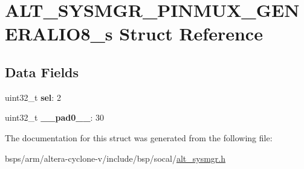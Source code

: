 \hypertarget{structALT__SYSMGR__PINMUX__GENERALIO8__s}{}\section{A\+L\+T\+\_\+\+S\+Y\+S\+M\+G\+R\+\_\+\+P\+I\+N\+M\+U\+X\+\_\+\+G\+E\+N\+E\+R\+A\+L\+I\+O8\+\_\+s Struct Reference}
\label{structALT__SYSMGR__PINMUX__GENERALIO8__s}
\subsection*{Data Fields}
\begin{DoxyCompactItemize}
\item 
\mbox{\label{structALT__SYSMGR__PINMUX__GENERALIO8__s_a3406c3f376d67e983743a19614cf184b}} 
uint32\+\_\+t {\bfseries sel}\+: 2
\item 
\mbox{\label{structALT__SYSMGR__PINMUX__GENERALIO8__s_a0c49b4a942a46657faf72721c74de5a2}} 
uint32\+\_\+t {\bfseries \+\_\+\+\_\+pad0\+\_\+\+\_\+}\+: 30
\end{DoxyCompactItemize}


The documentation for this struct was generated from the following file\+:\begin{DoxyCompactItemize}
\item 
bsps/arm/altera-\/cyclone-\/v/include/bsp/socal/\mbox{\hyperlink{alt__sysmgr_8h}{alt\+\_\+sysmgr.\+h}}\end{DoxyCompactItemize}
